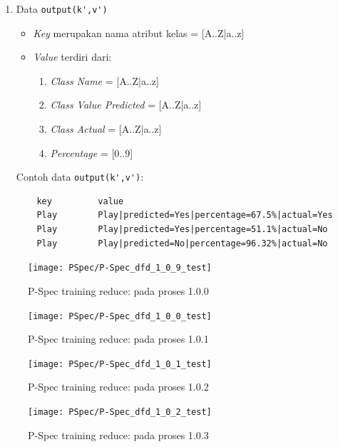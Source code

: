 \begin{enumerate}
	\item{Data \verb|output(k',v')|}
	\begin{itemize}
		\item \textit{Key} merupakan nama atribut kelas = [A..Z|a..z]
		
		\item \textit{Value} terdiri dari:
		\begin{enumerate}
			\item \textit{Class Name} = [A..Z|a..z]
			\item \textit{Class Value Predicted} = [A..Z|a..z]
			\item \textit{Class Actual} = [A..Z|a..z]
			\item \textit{Percentage} = [0..9]
		\end{enumerate}
		
	\end{itemize}
	Contoh data \verb|output(k',v')|:
	\begin{lstlisting}
	key			value
	Play		Play|predicted=Yes|percentage=67.5%|actual=Yes
	Play		Play|predicted=Yes|percentage=51.1%|actual=No
	Play		Play|predicted=No|percentage=96.32%|actual=No	
	\end{lstlisting}
	
\end{enumerate}


\begin{figure}[H]
	\centering
	\texttt{[image: PSpec/P-Spec\_dfd\_1\_0\_9\_test]}
	\caption[P-Spec training reduce: pada proses 1.0.0]{P-Spec training reduce: pada proses 1.0.0}
	\label{fig:P-Spec training reduce: pada proses 1.0.0}
\end{figure}

\begin{figure}[H]
	\centering
	\texttt{[image: PSpec/P-Spec\_dfd\_1\_0\_0\_test]}
	\caption[P-Spec training reduce: pada proses 1.0.1]{P-Spec training reduce: pada proses 1.0.1}
	\label{fig:P-Spec training reduce: pada proses 1.0.1}
\end{figure}

\begin{figure}[H]
	\centering
	\texttt{[image: PSpec/P-Spec\_dfd\_1\_0\_1\_test]}
	\caption[P-Spec training reduce: pada proses 1.0.2]{P-Spec training reduce: pada proses 1.0.2}
	\label{fig:P-Spec training reduce: pada proses 1.0.2}
\end{figure}

\begin{figure}[H]
	\centering
	\texttt{[image: PSpec/P-Spec\_dfd\_1\_0\_2\_test]}
	\caption[P-Spec training reduce: pada proses 1.0.3]{P-Spec training reduce: pada proses 1.0.3}
	\label{fig:P-Spec training reduce: pada proses 1.0.3}
\end{figure}

